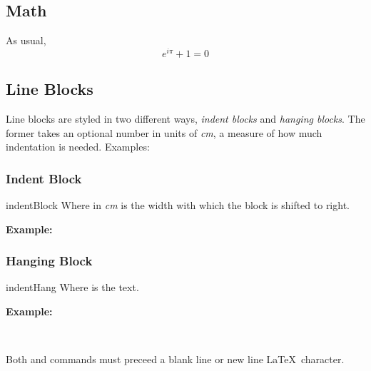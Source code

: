 \documentclass[12pt,a4paper]{report}
\begin{document}
\subsection{Math}
As usual,
\begin{equation}
  e^{i\pi}+1=0
  \label{eqn:euler}
\end{equation}

\subsection{Line Blocks}
Line blocks are styled in two different ways, \emph{indent blocks} and \emph{hanging blocks}. The former takes an optional number in units of \emph{cm}, a measure of how much indentation is needed. Examples:\\

\subsubsection{Indent Block}
\begin{docCommand}%
	[]{indentBlock}{}
	Where  in \emph{cm} is the width with which the block is shifted to right.
\end{docCommand}
\noindent
\textbf{Example:}	

\subsubsection{Hanging Block}
\begin{docCommand}%
	[]{indentHang}{}
	Where  is the text.
\end{docCommand}
\noindent
\textbf{Example:}

\\

\begin{note}
Both  and  commands must preceed a blank line or new line \LaTeX\ character.
\end{note}
\end{document}
